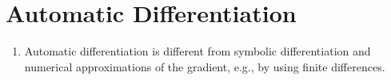 




\section{Automatic Differentiation}

\begin{enumerate}
    \item Automatic differentiation is different from symbolic differentiation and numerical approximations of the gradient, e.g., by using finite differences.
    \hfill \cite{mfml/book/mml/Deisenroth-Faisal-Ong}
\end{enumerate}

























